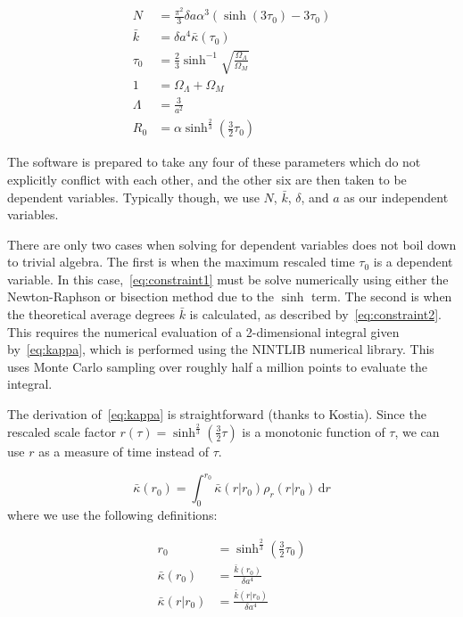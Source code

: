 \documentclass[preprint,notitlepage,amsmath,amssymb,floatfix]{revtex4-1}
\begin{document}
\begin{align}
N &= \frac{\pi^2}{3}\delta a\alpha^3\left(\sinh\left(3\tau_0\right)-3\tau_0\right) \label{eq:constraint1} \\
\bar{k} &= \delta a^4\bar{\kappa}\left(\tau_0\right) \label{eq:constraint2} \\
\tau_0 &= \frac{2}{3}\sinh^{-1}\sqrt{\frac{\Omega_\Lambda}{\Omega_M}} \label{eq:constraint3} \\
1 &= \Omega_\Lambda + \Omega_M \label{eq:constraint4} \\
\Lambda &= \frac{3}{a^2} \label{eq:constraint5} \\
R_0 &= \alpha\sinh^{\frac{2}{3}}\left(\frac{3}{2}\tau_0\right) \label{eq:constraint6}
\end{align}

\noindent The software is prepared to take any four of these parameters which do not explicitly conflict with each other, and the other six are then taken to be dependent variables.  
Typically though, we use $N$, $\bar{k}$, $\delta$, and $a$ as our independent variables. \par
There are only two cases when solving for dependent variables does not boil down to trivial algebra.  
The first is when the maximum rescaled time $\tau_0$ is a dependent variable.  
In this case,~\eqref{eq:constraint1} must be solve numerically using either the Newton-Raphson or bisection method due to the $\sinh$ term.  
The second is when the theoretical average degrees $\bar{k}$ is calculated, as described by~\eqref{eq:constraint2}.  
This requires the numerical evaluation of a 2-dimensional integral given by~\eqref{eq:kappa}, which is performed using the NINTLIB numerical library.  
This uses Monte Carlo sampling over roughly half a million points to evaluate the integral. \par
The derivation of~\eqref{eq:kappa} is straightforward (thanks to Kostia).
Since the rescaled scale factor $r\left(\tau\right) = \sinh^{\frac{2}{3}}\left(\frac{3}{2}\tau\right)$ is a monotonic function of $\tau$, we can use $r$ as a measure of time instead of $\tau$.

\begin{equation}
\bar\kappa\left(r_0\right) = \int_0^{r_0}\!\bar\kappa\left(r|r_0\right)\rho_r\left(r|r_0\right)\,\mathrm dr 
\end{equation}
\noindent where we use the following definitions:

\begin{align}
r_0 &= \sinh^{\frac{2}{3}}\left(\frac{3}{2}\tau_0\right) \\
\bar\kappa\left(r_0\right) &= \frac{\bar k\left(r_0\right)}{\delta a^4} \\
\bar\kappa\left(r|r_0\right) &= \frac{\bar k\left(r|r_0\right)}{\delta a^4}
\end{align}
\end{document}
